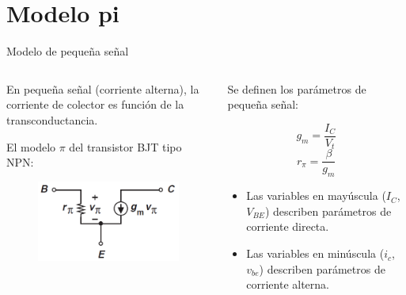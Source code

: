 \documentclass[t,aspectratio=169]{beamer}
\begin{document}
\section{Modelo pi}
\begin{frame}{Modelo de pequeña señal}

\begin{columns}
\begin{column}{0.5\textwidth}

En pequeña señal (corriente alterna), la corriente de colector es función de la transconductancia. 

\vspace{5mm}El modelo $\pi$ del transistor BJT tipo NPN:

\begin{figure}
    \includegraphics[width=\textwidth]{figuras/modelo_pequena_senal.png}
\end{figure}

\end{column}
\begin{column}{0.5\textwidth}

    Se definen los parámetros de pequeña señal:

    \[ g_m = \dfrac{I_C}{V_t} \]
    \[ r_\pi = \dfrac{\beta}{g_m} \]

\begin{itemize}
    \item Las variables en mayúscula ($I_C$, $V_{BE}$) describen parámetros de corriente directa.
    \item Las variables en minúscula ($i_c$, $v_{be}$) describen parámetros de corriente alterna.
\end{itemize}



\end{column}
\end{columns}
    
\end{frame}
\end{document}
